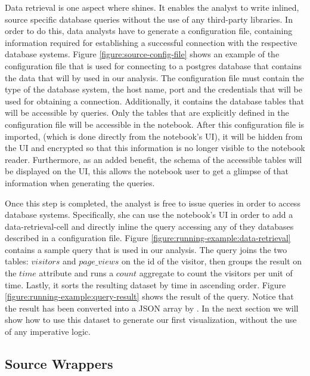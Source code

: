 Data retrieval is one aspect where {\projname} shines. It enables the analyst to write inlined, source specific database queries without the use of any third-party libraries. In order to do this, data analysts have to generate a configuration file, containing information required for establishing a successful connection with the respective database systems. Figure \ref{figure:source-config-file} shows an example of the configuration file that is used for connecting to a postgres database that contains the data that will by used in our analysis. The configuration file must contain the type of the database system, the host name, port and the credentials that will be used for obtaining a connection. Additionally, it contains the database tables that will be accessible by queries. Only the tables that are explicitly defined in the configuration file will be accessible in the notebook. After this configuration file is imported, (which is done directly from the notebook's UI), it will be hidden from the UI and encrypted so that this information is no longer visible to the notebook reader.  Furthermore, as an added benefit, the schema of the accessible tables will be displayed on the UI, this allows the notebook user to get a glimpse of that information when generating the queries. 



Once this step is completed, the analyst is free to issue queries in order to access database systems. Specifically, she can use the notebook's UI in order to add a data-retrieval-cell and directly inline the query accessing any of they databases described in a configuration file. Figure \ref{figure:running-example:data-retrieval} contains a sample query that is used in our analysis. The query joins the two tables: $visitors$ and $page\_views$ on the id of the visitor, then groups the result on the $time$ attribute and runs a $count$ aggregate to count the visitors per unit of time. Lastly, it sorts the resulting dataset by time in ascending order. Figure \ref{figure:running-example:query-result} shows the result of the query. Notice that the result has been converted into a JSON array by \projname. In the next section we will show how to use this dataset to generate our first visualization, without the use of any imperative logic.

\subsection{Source Wrappers}
\label{subsection:source-wrappers}


